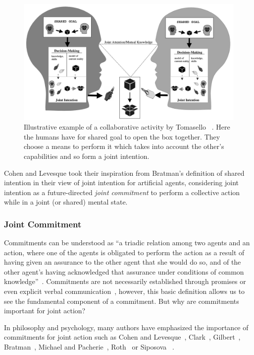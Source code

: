 \documentclass[a4paper,11pt,twoside]{StyleThese}
\begin{document}
 \begin{figure}[!ht]
 	\includegraphics[width=\linewidth]{figures/chapter1/shared_representation.png}
 	\caption{Illustrative example of a collaborative activity by Tomasello \etal~\cite{tomasello_2005_understanding}. Here the humans have for shared goal to open the box together. They choose a means to perform it which takes into account the other's capabilities and so form a joint	intention.}
 	\label{chap1:fig:ji}
 \end{figure}

Cohen and Levesque took their inspiration from Bratman's definition of shared intention in their view of joint intention for artificial agents, considering joint intention as a future-directed \emph{joint commitment} to perform a collective action while in a joint (or shared) mental state.

\subsubsection{Joint Commitment}\label{chap1:subsubsec:joint_commit}
Commitments can be understood as ``a triadic relation among two agents and an action, where one of the agents is obligated to perform the action as a result of having given an assurance to the other agent that she would do so, and of the other agent’s having acknowledged that assurance under conditions of common knowledge''~\cite[p.~756]{michael_2017_commitment}. Commitments are not necessarily established through promises or even explicit verbal communication~\cite{ledyard_1994_public, scanlon_2000_we, siposova_2018_communicative}, however, this basic definition allows us to see the fundamental component of a commitment. But why are commitments important for joint action?

In philosophy and psychology, many authors have emphasized the importance of commitments for joint action such as Cohen and Levesque~\cite{cohen_1991_teamwork}, Clark~\cite{clark_2006_social}, Gilbert~\cite{gilbert_2009_shared}, Bratman~\cite{bratman_2014_shared}, Michael and Pacherie~\cite{michael_2015_commitments}, Roth~\cite{roth_2014_shared} or Siposova \etal~\cite{siposova_2018_communicative}. 
\end{document}
